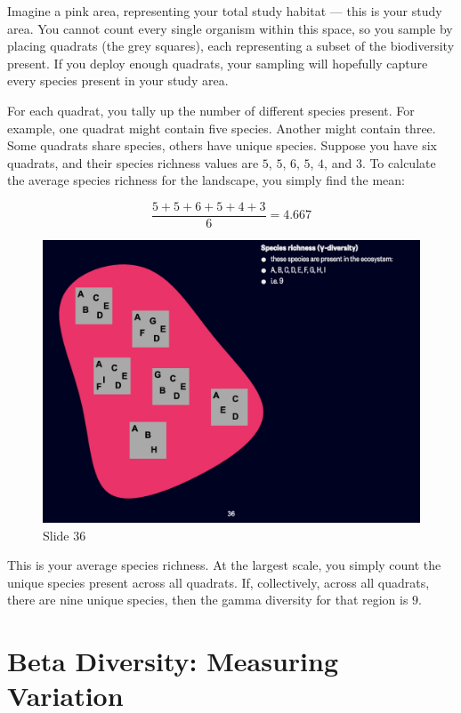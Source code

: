 \documentclass[
  12pt,
]{book}
\begin{document}
Imagine a pink area, representing your total study habitat --- this is
your study area. You cannot count every single organism within this
space, so you sample by placing quadrats (the grey squares), each
representing a subset of the biodiversity present. If you deploy enough
quadrats, your sampling will hopefully capture every species present in
your study area.

For each quadrat, you tally up the number of different species present.
For example, one quadrat might contain five species. Another might
contain three. Some quadrats share species, others have unique species.
Suppose you have six quadrats, and their species richness values are
\(5\), \(5\), \(6\), \(5\), \(4\), and \(3\). To calculate the average
species richness for the landscape, you simply find the mean:

\[
\frac{5 + 5 + 6 + 5 + 4 + 3}{6} = 4.667
\]

\begin{figure}[ht]
\centering
\includegraphics[width=0.8\linewidth]{../images/BDC334/BDC334-036.jpeg}
\caption*{Slide 36}
\end{figure}

This is your average species richness. At the largest scale, you simply
count the unique species present across all quadrats. If, collectively,
across all quadrats, there are nine unique species, then the gamma
diversity for that region is \(9\).

\section{Beta Diversity: Measuring
Variation}\label{beta-diversity-measuring-variation}
\end{document}
